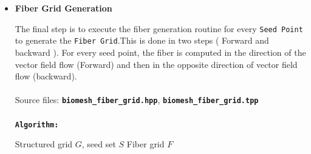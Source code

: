 \documentclass[11pt,a4paper]{article}
\begin{document}
\begin{itemize}
\begin{algorithmic}[1]
    \State $N_{\text{adaptive}} = 0$
    \State $N_{\text{adaptive}}^{\max} \gets \text{adaptive\_steps\_max}(T)$

    \State $cid \gets \mathrm{Index}\!\left(
    \left\{ c \in G \mid s \in c \right\}
\right)$



            \State $v_{curr} \gets s$
                \State $f \gets f \cup \{v_{curr}\}$ 
            \EndIf
        \EndIf

        \State $cid \gets \mathrm{Index}\!\left(
    \left\{ c \in G \mid v_{curr} \in c \right\}
\right)$
        \State $v_{previous} \gets v_{curr}$
        \State $v_{curr} \gets I(G, v)$ 

            \State $v_{diff} \gets v_{new} - v_{previous}$
                \State $v_{diff} \gets -v_{diff}$
            \EndIf
        \EndIf

                    \State \textbf{break}
                \Else
                    \State $\Delta t \gets \frac{\Delta t}{2}$ 
                    \State $N_{\text{adaptive}} \gets N_{\text{adaptive}} + 1$
                \EndIf
            \Else
                \State \textbf{break}
            \EndIf
        \EndIf

        \State v_{} \gets v_{previous} + \\
        \State $t_{\text{start}} \gets t_{\text{start}} + \Delta t$

    \EndWhile
\end{algorithmic}
\item \textbf{Fiber Grid Generation}

    The final step is to execute the fiber generation routine for every \texttt{Seed Point} to generate the \texttt{Fiber Grid}.This is done in two steps ( Forward and backward ). For every seed point, the fiber is computed in the direction of the vector field flow (Forward) and then in the opposite direction of vector field flow (backward).\\
    \\
    Source files: \texttt{\textbf{biomesh\_fiber\_grid.hpp}}, \texttt{\textbf{biomesh\_fiber\_grid.tpp}}\\
    \\
    \texttt{\textbf{Algorithm:}}
\begin{algorithmic}[1]
    \Require Structured grid $G$, seed set $S$
    \Ensure Fiber grid $F$


\end{algorithmic}
\end{itemize}
\end{document}
